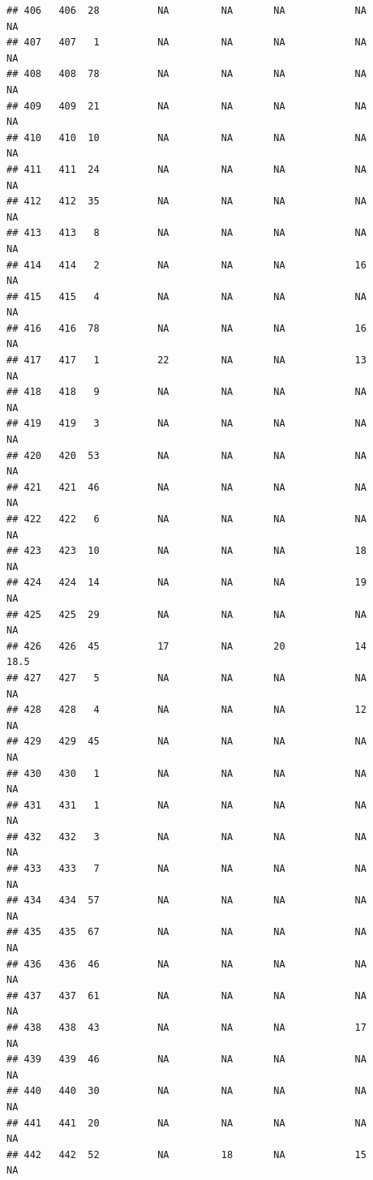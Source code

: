\documentclass[man]{apa6}
\begin{document}
\begin{verbatim}
## 406   406  28          NA         NA       NA            NA       NA
## 407   407   1          NA         NA       NA            NA       NA
## 408   408  78          NA         NA       NA            NA       NA
## 409   409  21          NA         NA       NA            NA       NA
## 410   410  10          NA         NA       NA            NA       NA
## 411   411  24          NA         NA       NA            NA       NA
## 412   412  35          NA         NA       NA            NA       NA
## 413   413   8          NA         NA       NA            NA       NA
## 414   414   2          NA         NA       NA            16       NA
## 415   415   4          NA         NA       NA            NA       NA
## 416   416  78          NA         NA       NA            16       NA
## 417   417   1          22         NA       NA            13       NA
## 418   418   9          NA         NA       NA            NA       NA
## 419   419   3          NA         NA       NA            NA       NA
## 420   420  53          NA         NA       NA            NA       NA
## 421   421  46          NA         NA       NA            NA       NA
## 422   422   6          NA         NA       NA            NA       NA
## 423   423  10          NA         NA       NA            18       NA
## 424   424  14          NA         NA       NA            19       NA
## 425   425  29          NA         NA       NA            NA       NA
## 426   426  45          17         NA       20            14     18.5
## 427   427   5          NA         NA       NA            NA       NA
## 428   428   4          NA         NA       NA            12       NA
## 429   429  45          NA         NA       NA            NA       NA
## 430   430   1          NA         NA       NA            NA       NA
## 431   431   1          NA         NA       NA            NA       NA
## 432   432   3          NA         NA       NA            NA       NA
## 433   433   7          NA         NA       NA            NA       NA
## 434   434  57          NA         NA       NA            NA       NA
## 435   435  67          NA         NA       NA            NA       NA
## 436   436  46          NA         NA       NA            NA       NA
## 437   437  61          NA         NA       NA            NA       NA
## 438   438  43          NA         NA       NA            17       NA
## 439   439  46          NA         NA       NA            NA       NA
## 440   440  30          NA         NA       NA            NA       NA
## 441   441  20          NA         NA       NA            NA       NA
## 442   442  52          NA         18       NA            15       NA

\end{verbatim}
\end{document}
